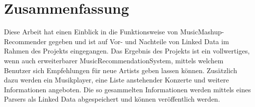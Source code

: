 \section{Zusammenfassung}

Diese Arbeit hat einen Einblick in die Funktionsweise von MusicMashup-Recommender gegeben und ist auf Vor- und Nachteile von Linked Data im Rahmen des Projekts eingegangen. Das Ergebnis des Projekts ist ein vollwertiges, wenn auch erweiterbarer MusicRecommendationSystem, mittels welchem Benutzer sich Empfehlungen für neue Artists geben lassen können. Zusätzlich dazu werden ein Musikplayer, eine Liste anstehender Konzerte und weitere Informationen angeboten. Die so gesammelten Informationen werden mittels eines Parsers als Linked Data abgespeichert und können veröffentlich werden.

